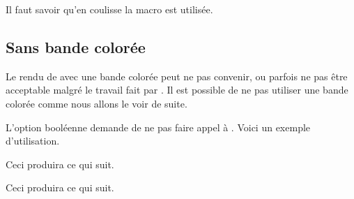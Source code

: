 \begin{bdocnote}
    Il faut savoir qu'en coulisse la macro  est utilisée.

    \begin{bdoclatex}[std]
    \end{bdoclatex}
\end{bdocnote}



\subsection{Sans bande colorée}

Le rendu de  avec une bande colorée peut ne pas convenir, ou parfois ne pas être acceptable malgré le travail fait par .
Il est possible de ne pas utiliser une bande colorée comme nous allons le voir de suite.

\begin{bdocexa}
    L'option booléenne  demande de ne pas faire appel à .
    Voici un exemple d'utilisation.


    Ceci produira ce qui suit.

    \medskip

    
\end{bdocexa}




\begin{bdocexa}
    \leavevmode


    Ceci produira ce qui suit.

    \medskip

    
\end{bdocexa}



